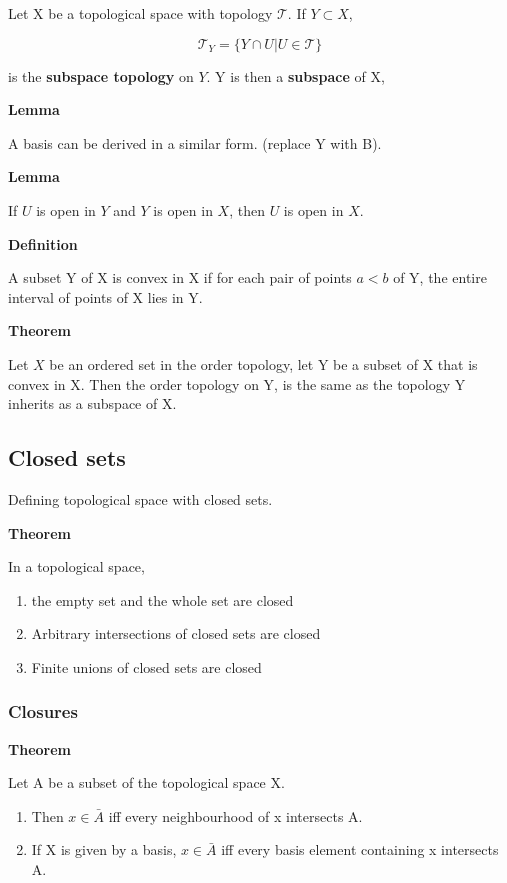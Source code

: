 \documentclass[11pt]{article}
\begin{document}
Let X be a topological space with topology \(\mathcal{T}\). If \(Y \subset X\),

\[
\mathcal{T}_Y = \{Y \cap U \vert U \in \mathcal{T}\}
\]

is the \textbf{subspace topology} on \(Y\). Y is then a \textbf{subspace} of X,

\textbf{Lemma}

A basis can be derived in a similar form. (replace Y with B).

\textbf{Lemma}

If \(U\) is open in \(Y\) and \(Y\) is open in \(X\), then \(U\) is open in \(X\).

\textbf{Definition}

A subset Y of X is convex in X if for each pair of points \(a < b\) of Y, the entire interval of points of X lies in Y.


\textbf{Theorem}

Let \(X\) be an ordered set in the order topology, let Y be a subset of X that is convex in X. Then the order topology on Y, is the same as the topology Y inherits as a subspace of X.


\subsection{Closed sets}
\label{sec:org382a78b}

Defining topological space with closed sets.

\textbf{Theorem}

In a topological space,

\begin{enumerate}
\item the empty set and the whole set are closed
\item Arbitrary intersections of closed sets are closed
\item Finite unions of closed sets are closed
\end{enumerate}

\subsubsection{Closures}
\label{sec:org60f728e}

\textbf{Theorem}

Let A be a subset of the topological space X.
\begin{enumerate}
\item Then \(x \in \bar{A}\) iff every neighbourhood of x intersects A.
\item If X is given by a basis, \(x \in \bar{A}\) iff every basis element containing x intersects A.
\end{enumerate}
\end{document}
